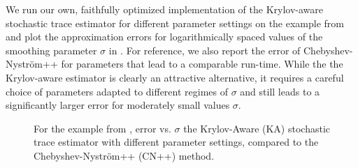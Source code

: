 
We run our own, faithfully optimized implementation of the Krylov-aware stochastic trace estimator \cite[Algorithm 3.1]{chen-2023-krylovaware-stochastic} for different parameter settings on the example from  and plot the approximation errors for logarithmically spaced values of the smoothing parameter $\sigma$ in . For reference, we also report the error of Chebyshev-Nyström++ for parameters that lead to a comparable run-time. While the the Krylov-aware estimator is clearly an attractive alternative, it requires a careful choice of parameters adapted to  different regimes of $\sigma$ and still leads to a significantly larger error for moderately small values $\sigma$.

\begin{figure}[ht]
    \begin{minipage}[c]{.475\linewidth}
        \centering
        
    \end{minipage}\hfill%
    \begin{minipage}[c]{.475\linewidth}
        \vspace{-35pt}
        
        \newline
        \vspace{15pt}
        \newline
        
    \end{minipage}
    \caption{For the example from , error vs. $\sigma$ the Krylov-Aware (KA) stochastic trace estimator with different parameter settings, compared to the Chebyshev-Nyström++ (CN++) method.}
    \label{fig:krylov-aware-density}
\end{figure}

